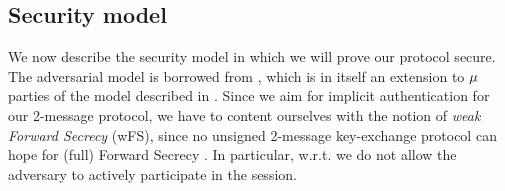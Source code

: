 \subsection{Security model}\label{subsec:secmodel}
We now describe the security model in which we will prove our protocol secure.
The adversarial model is borrowed from \cite[Section 6.1]{PQR22}, which is in itself an extension to $\mu$ parties of the model described in \cite{JKRS20}.
Since we aim for implicit authentication for our 2-message protocol, we have to content ourselves with the notion of \textit{weak Forward Secrecy} (wFS), since no unsigned 2-message key-exchange protocol can hope for (full) Forward Secrecy \cite[Section 3.2]{HMQV}.
In particular, w.r.t. \cite[Section 6.1]{PQR22} we do not allow the adversary to actively participate in the session.